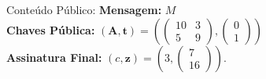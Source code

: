 \documentclass{beamer}
\begin{document}
\begin{frame}{Conteúdo Público:}
    \textbf{Mensagem: }$M$\\
    \vspace{1em}
    \textbf{Chaves Pública:} $(\mathbf{A}, \mathbf{t}) = (\begin{pmatrix} 10 & 3 \\ 5 & 9 \end{pmatrix}, \begin{pmatrix} 0 \\ 1 \end{pmatrix})$ \\ 
    \vspace{1em}
    \textbf{Assinatura Final:} $(c, \mathbf{z}) = (3, \begin{pmatrix} 7 \\ 16 \end{pmatrix})$.
\end{frame}
\end{document}
